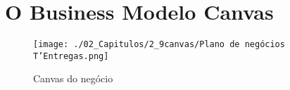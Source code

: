 \section{\textbf{O Business Modelo Canvas}}
\label{sec: O business modelo Canvas}

\begin{commentA} \vspace{0.3cm} \noindent * \par \vspace{0.1cm} \end{commentA}


\begin{figure}[H]
\captionsetup{textfont=bf, labelfont=bf, font=footnotesize}
\caption{Canvas do negócio}
\vspace{-0.4cm}
\label{fig: Canvas do negócio}
\texttt{[image: ./02\_Capitulos/2\_9canvas/Plano de negócios T'Entregas.png]}
\end{figure}
